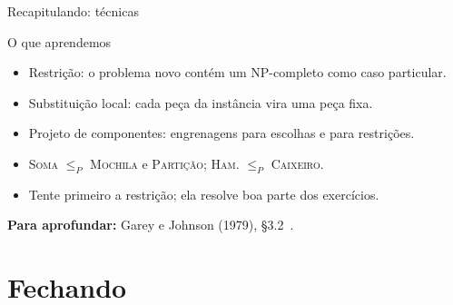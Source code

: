 \documentclass[aspectratio=169,xcolor=table]{beamer}
\newcommand{\fonte}[1]{%
  \vfill
  {\tiny\color{gray!55!black}\textbf{Para aprofundar:} #1\par}%
}
\newcommand{\prob}[1]{\textsc{#1}}
\begin{document}
\begin{frame}{Recapitulando: técnicas}
  \begin{block}{O que aprendemos}
    \begin{itemize}
      \item Restrição: o problema novo contém um NP-completo como caso particular.
      \item Substituição local: cada peça da instância vira uma peça fixa.
      \item Projeto de componentes: engrenagens para escolhas e para restrições.
      \item \prob{Soma} $\le_P$ \prob{Mochila} e \prob{Partição}; \prob{Ham.} $\le_P$
            \prob{Caixeiro}.
      \item Tente primeiro a restrição; ela resolve boa parte dos exercícios.
    \end{itemize}
  \end{block}
  \fonte{Garey e Johnson (1979), \S 3.2~\cite{garey1979computers}.}
\end{frame}

\section*{Fechando}
\end{document}
